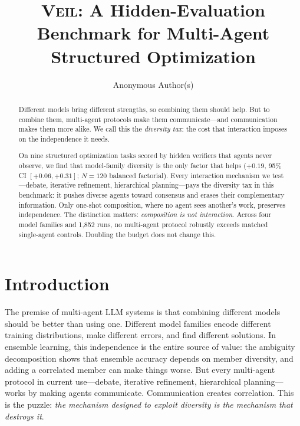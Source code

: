 \documentclass{article}
\title{\textsc{Veil}: A Hidden-Evaluation Benchmark for Multi-Agent Structured Optimization}
\author{%
  Anonymous Author(s)
}
\begin{document}
\maketitle

\begin{abstract}
Different models bring different strengths, so combining them should help. But to combine them, multi-agent protocols make them communicate---and communication makes them more alike. We call this the \emph{diversity tax}: the cost that interaction imposes on the independence it needs.

On nine structured optimization tasks scored by hidden verifiers that agents never observe, we find that model-family diversity is the only factor that helps ($+0.19$, 95\% CI $[+0.06, +0.31]$; $N{=}120$ balanced factorial). Every interaction mechanism we test---debate, iterative refinement, hierarchical planning---pays the diversity tax in this benchmark: it pushes diverse agents toward consensus and erases their complementary information. Only one-shot composition, where no agent sees another's work, preserves independence. The distinction matters: \emph{composition is not interaction}. Across four model families and 1{,}852 runs, no multi-agent protocol robustly exceeds matched single-agent controls. Doubling the budget does not change this.
\end{abstract}

\section{Introduction}
\label{sec:intro}

The premise of multi-agent LLM systems is that combining different models should be better than using one. Different model families encode different training distributions, make different errors, and find different solutions. In ensemble learning, this independence is the entire source of value: the ambiguity decomposition \citep{krogh1994neural} shows that ensemble accuracy depends on member diversity, and adding a correlated member can make things worse. But every multi-agent protocol in current use---debate, iterative refinement, hierarchical planning---works by making agents communicate. Communication creates correlation. This is the puzzle: \emph{the mechanism designed to exploit diversity is the mechanism that destroys it}.
\end{document}

